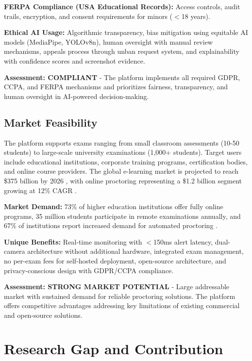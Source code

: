 \textbf{FERPA Compliance (USA Educational Records):} Access controls, audit trails, encryption, and consent requirements for minors ($<$18 years).

\textbf{Ethical AI Usage:} Algorithmic transparency, bias mitigation using equitable AI models (MediaPipe, YOLOv8n), human oversight with manual review mechanisms, appeals process through unban request system, and explainability with confidence scores and screenshot evidence.

\textbf{Assessment: COMPLIANT} - The platform implements all required GDPR, CCPA, and FERPA mechanisms and prioritizes fairness, transparency, and human oversight in AI-powered decision-making.

\subsection{Market Feasibility}

The platform supports exams ranging from small classroom assessments (10-50 students) to large-scale university examinations (1,000+ students). Target users include educational institutions, corporate training programs, certification bodies, and online course providers. The global e-learning market is projected to reach \$375 billion by 2026 \cite{globalmarket2020}, with online proctoring representing a \$1.2 billion segment growing at 12\% CAGR \cite{marketsandmarkets2021}.

\textbf{Market Demand:} 73\% of higher education institutions offer fully online programs, 35 million students participate in remote examinations annually, and 67\% of institutions report increased demand for automated proctoring \cite{educause2021, insidehighered2021}.

\textbf{Unique Benefits:} Real-time monitoring with $<$150ms alert latency, dual-camera architecture without additional hardware, integrated exam management, no per-exam fees for self-hosted deployment, open-source architecture, and privacy-conscious design with GDPR/CCPA compliance.

\textbf{Assessment: STRONG MARKET POTENTIAL} - Large addressable market with sustained demand for reliable proctoring solutions. The platform offers competitive advantages addressing key limitations of existing commercial and open-source solutions.

\section{Research Gap and Contribution}

